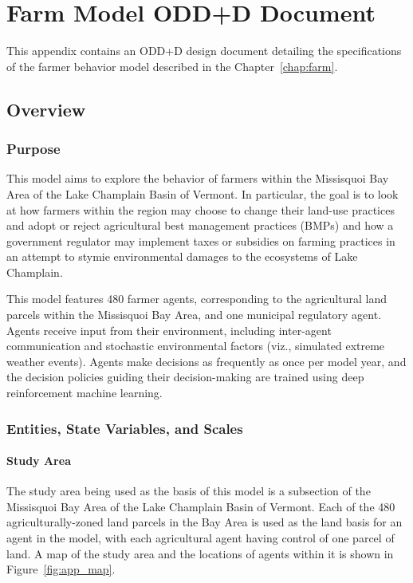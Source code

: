 \chapter{Farm Model ODD+D Document}
\label{app:farm}

This appendix contains an ODD+D design document
detailing the specifications of the farmer behavior model described in the
Chapter~\ref{chap:farm}.

\section{Overview}
\subsection{Purpose}

This model aims to explore the behavior of farmers within the Missisquoi Bay Area of the Lake Champlain Basin of Vermont. In particular, the goal is to look at how farmers within the region may choose to change their land-use practices and adopt or reject agricultural best management practices (BMPs) and how a government regulator may implement taxes or subsidies on farming practices in an attempt to stymie environmental damages to the ecosystems of Lake Champlain.

This model features 480 farmer agents, corresponding to the agricultural land parcels within the Missisquoi Bay Area, and one municipal regulatory agent. Agents receive input from their environment, including inter-agent communication and stochastic environmental factors (viz., simulated extreme weather events). Agents make decisions as frequently as once per model year, and the decision policies guiding their decision-making are trained using deep reinforcement machine learning.

\subsection{Entities, State Variables, and Scales}

\subsubsection{Study Area}
The study area being used as the basis of this model is a subsection 
of the Missisquoi Bay Area of the Lake Champlain Basin of Vermont. 
Each of the 480 agriculturally-zoned land parcels in the Bay Area is used as the land basis for an agent in the model, 
with each agricultural agent having control of one parcel of land.
A map of the study area and the locations of agents within it is
shown in Figure~\ref{fig:app_map}.

